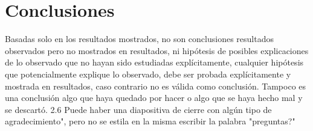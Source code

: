 \documentclass[11pt, a4paper]{article}
\begin{document}
    \section{Conclusiones}

        Basadas solo en los resultados mostrados, no son conclusiones
        resultados observados pero no mostrados en resultados, ni hipótesis de posibles explicaciones de
        lo observado que no hayan sido estudiadas explícitamente, cualquier hipótesis que
        potencialmente explique lo observado, debe ser probada explícitamente y mostrada en resultados,
        caso contrario no es válida como conclusión. Tampoco es una conclusión algo que haya quedado
        por hacer o algo que se haya hecho mal y se descartó.
        2.6 Puede haber una diapositiva de cierre con algún tipo de agradecimiento", pero no se estila en
        la misma escribir la palabra "preguntas?"
\end{document}
